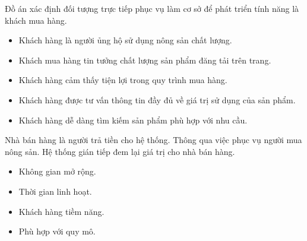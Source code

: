 Đồ án xác định đối tượng trực tiếp phục vụ làm cơ sở để phát triển tính năng là khách mua hàng.

\begin{itemize}
	\item Khách hàng là người ủng hộ sử dụng nông sản chất lượng.
	\item Khách mua hàng tin tưởng chất lượng sản phẩm đăng tải trên trang.
	\item Khách hàng cảm thấy tiện lợi trong quy trình mua hàng.
	\item Khách hàng được tư vấn thông tin đầy đủ về giá trị sử dụng của sản phẩm.
	\item Khách hàng dễ dàng tìm kiếm sản phẩm phù hợp với nhu cầu.
\end{itemize}
Nhà bán hàng là người trả tiền cho hệ thống. Thông qua việc phục vụ người mua nông sản. Hệ thống gián tiếp đem lại giá
trị cho nhà bán hàng.
\begin{itemize}
	\item Không gian mở rộng.
	\item Thời gian linh hoạt.
	\item Khách hàng tiềm năng.
	\item Phù hợp với quy mô.
\end{itemize}
